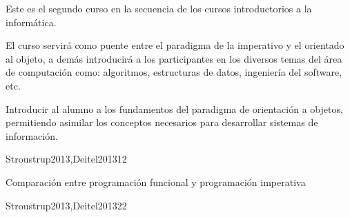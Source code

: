 \begin{syllabus}


\begin{justification}
Este es el segundo curso en la secuencia de los cursos introductorios a la informática.

El curso servirá como puente entre el paradigma de la imperativo y el orientado al objeto, a demás introducirá a los participantes en los diversos temas del área de computación como: algoritmos, estructuras de datos, ingeniería del software, etc.
\end{justification}

\begin{goals}
\item Introducir al alumno a los fundamentos del paradigma de
      orientación a objetos, permitiendo asimilar los conceptos
      necesarios para desarrollar  sistemas de información.
\end{goals}

\begin{outcomes}
\end{outcomes}

\begin{unit}{\PLOverviewDef}{Stroustrup2013,Deitel2013}{1}{2}
   \begin{topics}
      \item \PLOverviewTopicBrief
      \item Comparación entre programación funcional y programación imperativa
      \item \PLOverviewTopicHistory
   \end{topics}

   \begin{unitgoals}
      \item \PLOverviewObjONE
      \item \PLOverviewObjTWO
      \item \PLOverviewObjTHREE
   \end{unitgoals}
\end{unit}

\begin{unit}{\PLVirtualMachinesDef}{Stroustrup2013,Deitel2013}{2}{2}
   \begin{topics}
      \item \PLVirtualMachinesTopicETheconcept%
      \item \PLVirtualMachinesTopicHierarchy%
      \item \PLVirtualMachinesTopicIntermediate%
   \end{topics}


\end{unit}
\end{syllabus}
